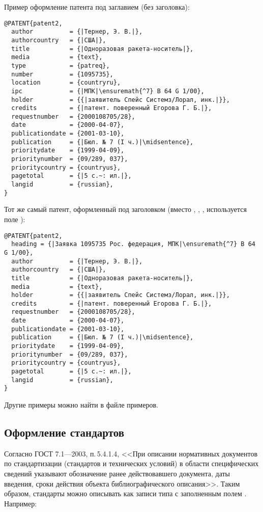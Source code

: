 \documentclass[10pt,a4paper,headings=small,numbers=enddot,english,russian]{ltxdockit}
\newcommand*{\gostbibname}[1][]{ГОСТ#1 7.1---2003\xspace}
\newcommand*{\gostbibref}[2][]{\gostbibname[#1], п.\,#2\xspace}
\begin{document}
Пример оформление патента под заглавием (без заголовка):
\begin{lstlisting}[style=bibtex,escapechar=|]
@PATENT{patent2,
  author          = {|Тернер, Э. В.|},
  authorcountry   = {|США|},
  title           = {|Одноразовая ракета-носитель|},
  media           = {text},
  type            = {patreq},
  number          = {1095735},
  location        = {countryru},
  ipc             = {|МПК|\ensuremath{^7} B 64 G 1/00},
  holder          = {{|заявитель Спейс Системз/Лорал, инк.|}},
  credits         = {|патент. поверенный Егорова Г. Б.|},
  requestnumber   = {2000108705/28},
  date            = {2000-04-07},
  publicationdate = {2001-03-10},
  publication     = {|Бюл. № 7 (I ч.)|\midsentence},
  prioritydate    = {1999-04-09},
  prioritynumber  = {09/289, 037},
  prioritycountry = {countryus},
  pagetotal       = {|5 с.~: ил.|},
  langid          = {russian},
}
\end{lstlisting}

Тот же самый патент, оформленный под заголовком (вместо
, , , 
используется поле ):

\begin{lstlisting}[style=bibtex,escapechar=|]
@PATENT{patent2,
  heading = {|Заявка 1095735 Рос. федерация, МПК|\ensuremath{^7} B 64 G 1/00},
  author          = {|Тернер, Э. В.|},
  authorcountry   = {|США|},
  title           = {|Одноразовая ракета-носитель|},
  media           = {text},
  holder          = {{|заявитель Спейс Системз/Лорал, инк.|}},
  credits         = {|патент. поверенный Егорова Г. Б.|},
  requestnumber   = {2000108705/28},
  date            = {2000-04-07},
  publicationdate = {2001-03-10},
  publication     = {|Бюл. № 7 (I ч.)|\midsentence},
  prioritydate    = {1999-04-09},
  prioritynumber  = {09/289, 037},
  prioritycountry = {countryus},
  pagetotal       = {|5 с.~: ил.|},
  langid          = {russian},
}
\end{lstlisting}

Другие примеры можно найти в файле примеров.

\subsection{Оформление стандартов}
\label{sec:standards}

Согласно \gostbibref{5.4.1.4},
<<При описании нормативных документов по стандартизации (стандартов и технических
условий) в области специфических сведений указывают обозначение ранее действовавшего документа,
даты введения, сроки действия объекта библиографического описания>>.
Таким образом, стандарты можно описывать как записи типа  с
заполненным полем . Например:
\end{document}
